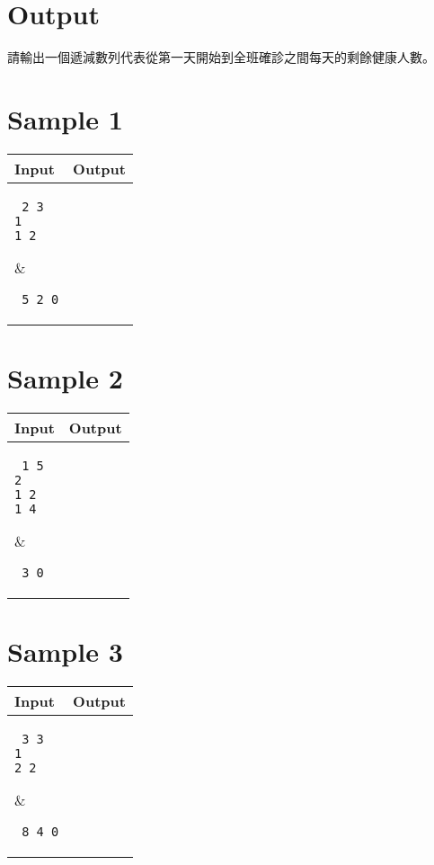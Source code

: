 \documentclass[11pt,a4paper]{article}
\begin{document}
\section*{Output}

請輸出一個遞減數列代表從第一天開始到全班確診之間每天的剩餘健康人數。

\section*{Sample 1}
\begin{longtable}[!h]{|p{}|p{}|}
\hline
\textbf {Input}	& \textbf {Output} \\
\hline
\parbox[t]{0.5\textwidth} %
{ \tt
2 3\\
1\\
1 2\\
} &
\parbox[t]{0.5\textwidth}
{ \tt
5 2 0\\
} \\
\hline
\end{longtable}

\section*{Sample 2}
\begin{longtable}[!h]{|p{}|p{}|}
\hline
\textbf {Input}	& \textbf {Output} \\
\hline
\parbox[t]{0.5\textwidth} %
{ \tt
1 5\\
2\\
1 2\\
1 4\\
} &
\parbox[t]{0.5\textwidth}
{ \tt
3 0\\
} \\
\hline
\end{longtable}

\section*{Sample 3}
\begin{longtable}[!h]{|p{}|p{}|}
\hline
\textbf {Input}	& \textbf {Output} \\
\hline
\parbox[t]{0.5\textwidth} %
{ \tt
3 3\\
1\\
2 2\\
} &
\parbox[t]{0.5\textwidth}
{ \tt
8 4 0\\
} \\
\hline
\end{longtable}
\end{document}
